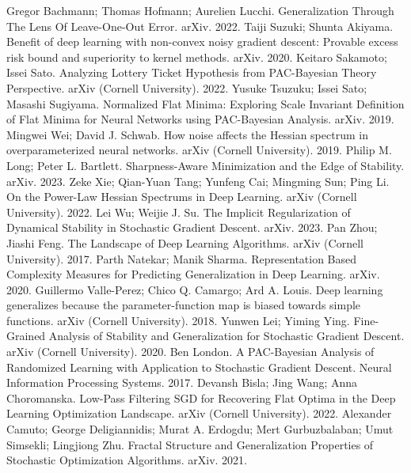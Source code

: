  Gregor Bachmann; Thomas Hofmann; Aurelien Lucchi. Generalization Through The Lens Of Leave-One-Out Error. arXiv. 2022.
 Taiji Suzuki; Shunta Akiyama. Benefit of deep learning with non-convex noisy gradient descent: Provable excess risk bound and superiority to kernel methods. arXiv. 2020.
 Keitaro Sakamoto; Issei Sato. Analyzing Lottery Ticket Hypothesis from PAC-Bayesian Theory Perspective. arXiv (Cornell University). 2022.
 Yusuke Tsuzuku; Issei Sato; Masashi Sugiyama. Normalized Flat Minima: Exploring Scale Invariant Definition of Flat Minima for Neural Networks using PAC-Bayesian Analysis. arXiv. 2019.
 Mingwei Wei; David J. Schwab. How noise affects the Hessian spectrum in overparameterized neural networks. arXiv (Cornell University). 2019.
 Philip M. Long; Peter L. Bartlett. Sharpness-Aware Minimization and the Edge of Stability. arXiv. 2023.
 Zeke Xie; Qian-Yuan Tang; Yunfeng Cai; Mingming Sun; Ping Li. On the Power-Law Hessian Spectrums in Deep Learning. arXiv (Cornell University). 2022.
 Lei Wu; Weijie J. Su. The Implicit Regularization of Dynamical Stability in Stochastic Gradient Descent. arXiv. 2023.
 Pan Zhou; Jiashi Feng. The Landscape of Deep Learning Algorithms. arXiv (Cornell University). 2017.
 Parth Natekar; Manik Sharma. Representation Based Complexity Measures for Predicting Generalization in Deep Learning. arXiv. 2020.
 Guillermo Valle-Perez; Chico Q. Camargo; Ard A. Louis. Deep learning generalizes because the parameter-function map is biased towards simple functions. arXiv (Cornell University). 2018.
 Yunwen Lei; Yiming Ying. Fine-Grained Analysis of Stability and Generalization for Stochastic Gradient Descent. arXiv (Cornell University). 2020.
 Ben London. A PAC-Bayesian Analysis of Randomized Learning with Application to Stochastic Gradient Descent. Neural Information Processing Systems. 2017.
 Devansh Bisla; Jing Wang; Anna Choromanska. Low-Pass Filtering SGD for Recovering Flat Optima in the Deep Learning Optimization Landscape. arXiv (Cornell University). 2022.
 Alexander Camuto; George Deligiannidis; Murat A. Erdogdu; Mert Gurbuzbalaban; Umut Simsekli; Lingjiong Zhu. Fractal Structure and Generalization Properties of Stochastic Optimization Algorithms. arXiv. 2021.
